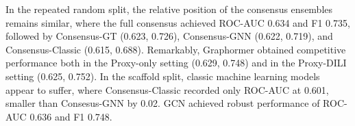 \documentclass[letterpaper]{article}
\begin{document}
In the repeated random split, the relative position of the consensus ensembles remains similar, where the full consensus achieved ROC-AUC 0.634 and F1 0.735, followed by Consensus-GT (0.623, 0.726), Consensus-GNN (0.622, 0.719), and Consensus-Classic (0.615, 0.688). Remarkably, Graphormer obtained competitive performance both in the Proxy-only setting (0.629, 0.748) and in the Proxy-DILI setting (0.625, 0.752). In the scaffold split, classic machine learning models appear to suffer, where Consensus-Classic recorded only ROC-AUC at 0.601, smaller than Consesus-GNN by 0.02. GCN achieved robust performance of ROC-AUC 0.636 and F1 0.748.


\end{document}
